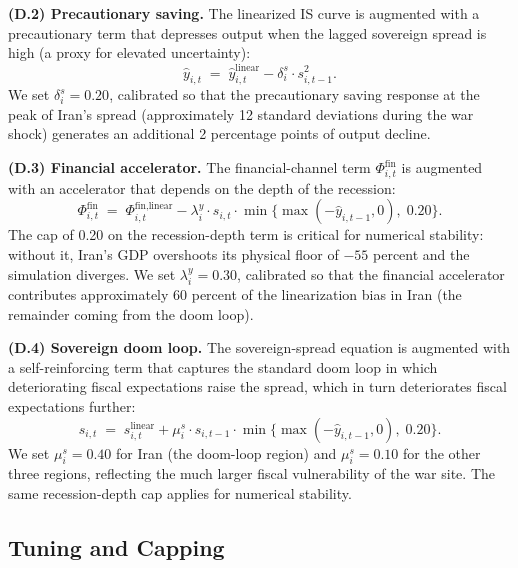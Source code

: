 \documentclass[12pt]{article}
\begin{document}
\textbf{(D.2) Precautionary saving.} The linearized IS curve is augmented with a precautionary term that depresses output when the lagged sovereign spread is high (a proxy for elevated uncertainty):
\begin{equation}
\hat{y}_{i,t} \;=\; \hat{y}_{i,t}^{\text{linear}} - \delta^s_i \cdot s_{i,t-1}^2.
\end{equation}
We set $\delta^s_i = 0.20$, calibrated so that the precautionary saving response at the peak of Iran's spread (approximately 12 standard deviations during the war shock) generates an additional 2 percentage points of output decline.

\textbf{(D.3) Financial accelerator.} The financial-channel term $\Phi^{\text{fin}}_{i,t}$ is augmented with an accelerator that depends on the depth of the recession:
\begin{equation}
\Phi^{\text{fin}}_{i,t} \;=\; \Phi^{\text{fin,linear}}_{i,t} - \lambda^y_i \cdot s_{i,t} \cdot \min\{\max(-\hat{y}_{i,t-1}, 0),\; 0.20\}.
\end{equation}
The cap of 0.20 on the recession-depth term is critical for numerical stability: without it, Iran's GDP overshoots its physical floor of $-55$ percent and the simulation diverges. We set $\lambda^y_i = 0.30$, calibrated so that the financial accelerator contributes approximately 60 percent of the linearization bias in Iran (the remainder coming from the doom loop).

\textbf{(D.4) Sovereign doom loop.} The sovereign-spread equation is augmented with a self-reinforcing term that captures the standard doom loop in which deteriorating fiscal expectations raise the spread, which in turn deteriorates fiscal expectations further:
\begin{equation}
s_{i,t} \;=\; s_{i,t}^{\text{linear}} + \mu^s_i \cdot s_{i,t-1} \cdot \min\{\max(-\hat{y}_{i,t-1}, 0),\; 0.20\}.
\end{equation}
We set $\mu^s_i = 0.40$ for Iran (the doom-loop region) and $\mu^s_i = 0.10$ for the other three regions, reflecting the much larger fiscal vulnerability of the war site. The same recession-depth cap applies for numerical stability.

\subsection{Tuning and Capping}
\end{document}

